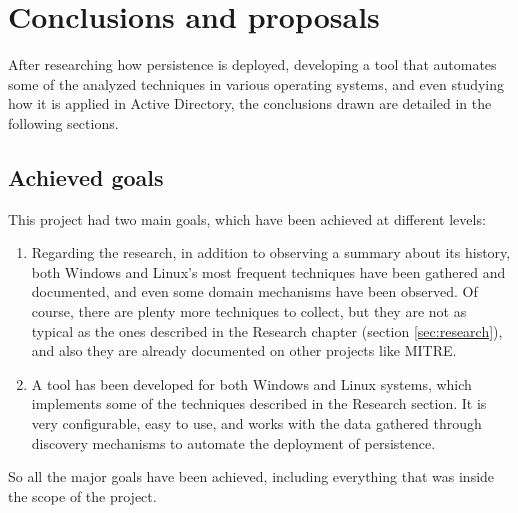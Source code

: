 
\pagebreak
\section{Conclusions and proposals}
\label{sec:conclusions}

After researching how persistence is deployed, developing a tool that automates some of the analyzed techniques in various operating systems, and even studying how it is applied in Active Directory, the conclusions drawn are detailed in the following sections.

\subsection{Achieved goals}
This project had two main goals, which have been achieved at different levels:
\begin{enumerate}
\item Regarding the research, in addition to observing a summary about its history, both Windows and Linux's most frequent techniques have been gathered and documented, and even some domain mechanisms have been observed. Of course, there are plenty more techniques to collect, but they are not as typical as the ones described in the Research chapter (section \ref{sec:research}), and also they are already documented on other projects like MITRE\cite{MitreWeb}.
\item A tool has been developed for both Windows and Linux systems, which implements some of the techniques described in the Research section. It is very configurable, easy to use, and works with the data gathered through discovery mechanisms to automate the deployment of persistence. 
\end{enumerate}

So all the major goals have been achieved, including everything that was inside the scope of the project.

